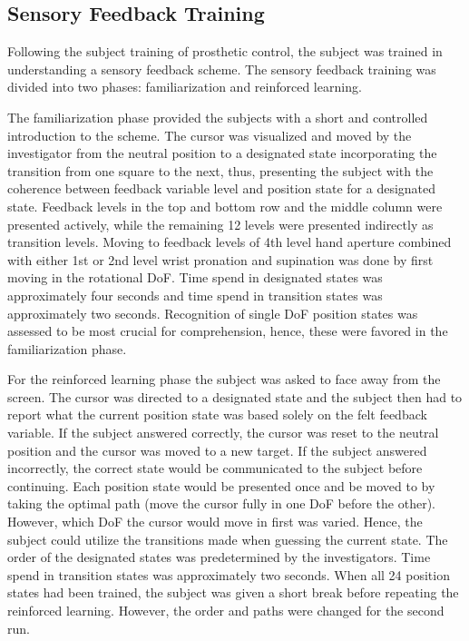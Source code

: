 
\subsection{Sensory Feedback Training}

Following the subject training of prosthetic control, the subject was trained in understanding a sensory feedback scheme. The sensory feedback training was divided into two phases: familiarization and reinforced learning. 

The familiarization phase provided the subjects with a short and controlled introduction to the scheme. The cursor was visualized and moved by the investigator from the neutral position to a designated state incorporating the transition from one square to the next, thus, presenting the subject with the coherence between feedback variable level and position state for a designated state. Feedback levels in the top and bottom row and the middle column were presented actively, while the remaining 12 levels were presented indirectly as transition levels. Moving to feedback levels of 4th level hand aperture combined with either 1st or 2nd level wrist pronation and supination was done by first moving in the rotational DoF. Time spend in designated states was approximately four seconds and time spend in transition states was approximately two seconds. Recognition of single DoF position states was assessed to be most crucial for comprehension, hence, these were favored in the familiarization phase. 

For the reinforced learning phase the subject was asked to face away from the screen. The cursor was directed to a designated state and the subject then had to report what the current position state was based solely on the felt feedback variable. If the subject answered correctly, the cursor was reset to the neutral position and the cursor was moved to a new target. If the subject answered incorrectly, the correct state would be communicated to the subject before continuing. Each position state would be presented once and be moved to by taking the optimal path (move the cursor fully in one DoF before the other). However, which DoF the cursor would move in first was varied. Hence, the subject could utilize the transitions made when guessing the current state. The order of the designated states was predetermined by the investigators. Time spend in transition states was approximately two seconds. When all 24 position states had been trained, the subject was given a short break before repeating the reinforced learning. However, the order and paths were changed for the second run.